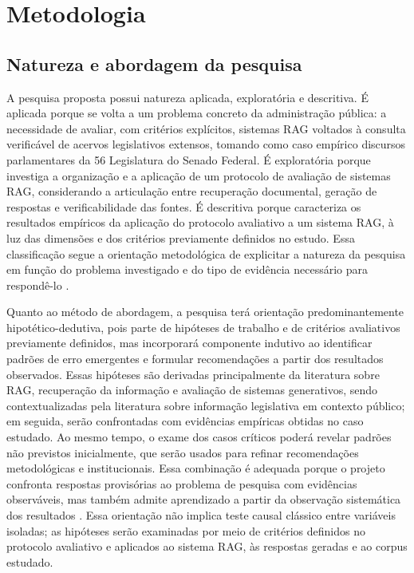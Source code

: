 \section{Metodologia}

\subsection{Natureza e abordagem da pesquisa}

A pesquisa proposta possui natureza aplicada, exploratória e descritiva. É aplicada porque se volta a um problema concreto da administração pública: a necessidade de avaliar, com critérios explícitos, sistemas RAG voltados à consulta verificável de acervos legislativos extensos, tomando como caso empírico discursos parlamentares da 56\textordfeminine{} Legislatura do Senado Federal. É exploratória porque investiga a organização e a aplicação de um protocolo de avaliação de sistemas RAG, considerando a articulação entre recuperação documental, geração de respostas e verificabilidade das fontes. É descritiva porque caracteriza os resultados empíricos da aplicação do protocolo avaliativo a um sistema RAG, à luz das dimensões e dos critérios previamente definidos no estudo. Essa classificação segue a orientação metodológica de explicitar a natureza da pesquisa em função do problema investigado e do tipo de evidência necessário para respondê-lo \parencite{gil2022projetosPesquisa}.

Quanto ao método de abordagem, a pesquisa terá orientação predominantemente hipotético-dedutiva, pois parte de hipóteses de trabalho e de critérios avaliativos previamente definidos, mas incorporará componente indutivo ao identificar padrões de erro emergentes e formular recomendações a partir dos resultados observados. Essas hipóteses são derivadas principalmente da literatura sobre RAG, recuperação da informação e avaliação de sistemas generativos, sendo contextualizadas pela literatura sobre informação legislativa em contexto público; em seguida, serão confrontadas com evidências empíricas obtidas no caso estudado. Ao mesmo tempo, o exame dos casos críticos poderá revelar padrões não previstos inicialmente, que serão usados para refinar recomendações metodológicas e institucionais. Essa combinação é adequada porque o projeto confronta respostas provisórias ao problema de pesquisa com evidências observáveis, mas também admite aprendizado a partir da observação sistemática dos resultados \parencite{lakatosMarconi2021metodologia}. Essa orientação não implica teste causal clássico entre variáveis isoladas; as hipóteses serão examinadas por meio de critérios definidos no protocolo avaliativo e aplicados ao sistema RAG, às respostas geradas e ao corpus estudado.

